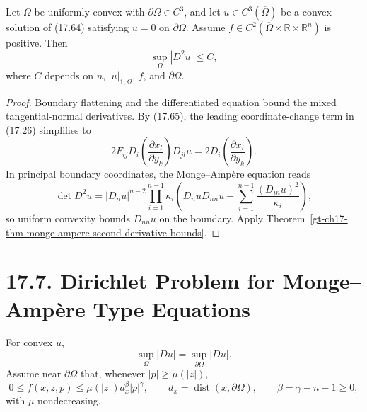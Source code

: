 \begin{theorem}
\label{gt-ch17-thm-global-hessian-zero-boundary-monge-ampere}
Let $\Omega$ be uniformly convex with $\partial\Omega\in C^3$, and let
$u\in C^3(\overline\Omega)$ be a convex solution of (17.64) satisfying
$u=0$ on $\partial\Omega$.  Assume
$f\in C^2(\overline\Omega\times\mathbb R\times\mathbb R^n)$ is positive.
Then
\begin{equation}\tag{17.75}
\sup_\Omega|D^2u|\le C,
\end{equation}
where $C$ depends on $n$, $|u|_{1;\Omega}$, $f$, and $\partial\Omega$.
\end{theorem}
\begin{proof}
\sketch Boundary flattening and the differentiated equation bound the mixed
tangential-normal derivatives. By (17.65), the leading coordinate-change term
in (17.26) simplifies to
\begin{equation}
\tag{17.73}
2F_{ij}D_i\left(\frac{\partial x_l}{\partial y_k}\right)D_{jl}u
=2D_i\left(\frac{\partial x_i}{\partial y_k}\right).
\end{equation}
In principal boundary coordinates, the
Monge--Amp\`ere equation reads
\[
\det D^2u=|D_nu|^{n-2}\prod_{i=1}^{n-1}\kappa_i
\left(D_nuD_{nn}u-\sum_{i=1}^{n-1}\frac{(D_{in}u)^2}{\kappa_i}\right),
\tag{17.74}
\]
so uniform convexity bounds $D_{nn}u$ on the boundary.  Apply
Theorem~\ref{gt-ch17-thm-monge-ampere-second-derivative-bounds}.
\end{proof}

\section*{17.7. Dirichlet Problem for Monge--Amp\`ere Type Equations}

For convex $u$,
\begin{equation}\tag{17.76}
\sup_\Omega|Du|=\sup_{\partial\Omega}|Du|.
\end{equation}
Assume near $\partial\Omega$ that, whenever $|p|\ge\mu(|z|)$,
\begin{equation}\tag{17.77}
0\le f(x,z,p)\le\mu(|z|)d_x^\beta|p|^\gamma,
\qquad d_x=\operatorname{dist}(x,\partial\Omega),
\qquad \beta=\gamma-n-1\ge0,
\end{equation}
with $\mu$ nondecreasing.

